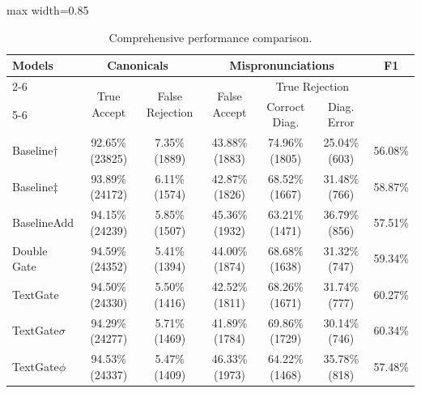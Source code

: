 \documentclass[a4paper]{article}
\begin{document}
\begin{table}

\centering
\begin{adjustbox}{max width=0.85\textwidth}
\begin{threeparttable}
    \caption{Comprehensive performance comparison. }
    \begin{tabular}{lcccccc}
    
\toprule
\toprule
    \multirow{3}{*}{Models} & 
    \multicolumn{2}{c}{Canonicals~} & \multicolumn{3}{c}{Mispronunciations~} & \multirow{3}{*}{F1} 
    \\ 
    \cline{2-6} & 
    \multirow{2}{*}{True Accept} & 
    \multirow{2}{*}{False Rejection} & 
    \multirow{2}{*}{False Accept} & 
    \multicolumn{2}{c}{True Rejection}               
    \\ 
    \cline{5-6}
    &&&&
    Corroct Diag. & 
    Diag. Error
    \\ 
    \toprule
    Baseline$\dagger$ & 
    92.65\% (23825) & 
    7.35\% (1889) &  
    43.88\% (1883) &  
    74.96\% (1805) &  
    25.04\% (603) &
    56.08\% %
    \\
    
    \rowcolor{gray!9}
    Baseline$\ddagger$ & 
    93.89\% (24172) & 
    6.11\% (1574) &  
    42.87\% (1826) &  
    68.52\% (1667) &  
    31.48\% (766) &
    58.87\% %
    \\
    \rowcolor{gray!9}
    BaselineAdd& 
    94.15\% (24239) & 
    5.85\% (1507) &  
    45.36\% (1932) &  
    63.21\% (1471) &  
    36.79\% (856) &
    57.51\% %
    \\
    \hline
    Double Gate & 
    94.59\% (24352) & 
    5.41\% (1394) &  
    44.00\% (1874) &  
    68.68\% (1638) &  
    31.32\% (747) &
    59.34\% %
    \\
    
    \rowcolor{gray!20}
    TextGate & 
    94.50\% (24330) & 
    5.50\% (1416) &  
    42.52\% (1811) &  
    68.26\% (1671) &  
    31.74\% (777) &
    60.27\% %
    \\
    
    \rowcolor{gray!20}
    TextGate$\sigma$ & 
    94.29\% (24277) & 
    5.71\% (1469) &  
    41.89\% (1784) &  
    69.86\% (1729) &  
    30.14\% (746) &
    60.34\% %
    \\
    
    \rowcolor{gray!20}
    TextGate$\phi$ & 
    94.53\% (24337) & 
    5.47\% (1409) &  
    46.33\% (1973) &  
    64.22\% (1468) &  
    35.78\% (818) &
    57.48\% %
    \\
    

\end{tabular}
\end{threeparttable}
\end{adjustbox}
\end{table}
\end{document}
